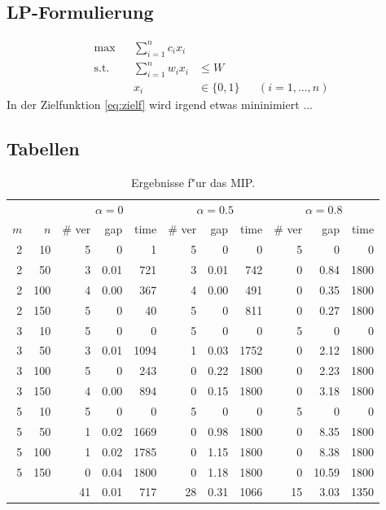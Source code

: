 \subsection{LP-Formulierung}
\label{subsec:lp}

\begin{align}
\max 	&& \sum_{i = 1}^n c_i x_i \label{eq:zielf}\\
\text{s.t.} && \sum_{i = 1}^n w_i x_i &\leq W&& \label{eq:c1}\\
	&& x_i & \in \{0, 1\} && (i = 1, \ldots, n)
\end{align}
In der Zielfunktion \eqref{eq:zielf} wird irgend etwas mininimiert ...



\subsection{Tabellen}

\begin{table}[!htbp] \centering
\small
\begin{tabular}{|r|r||r|r|r||r|r|r||r|r|r||} \hline
& & \multicolumn{3}{c||}{$\alpha=0$} & \multicolumn{3}{c||}{$\alpha=0.5$} & \multicolumn{3}{c||}{$\alpha=0.8$}\\
$m$ & $n$ & \# ver & gap & time &  \# ver & gap & time &  \# ver & gap & time  \\  \hline
2 & 10   & 5  & 0	& 1	& 5 & 0   	& 0	& 5 &0		& 0\\
2 & 50   & 3  & 0.01	& 721	& 3 & 0.01	& 742	& 0 &0.84	& 1800\\
2 & 100  & 4  & 0.00	& 367	& 4 & 0.00	& 491	& 0 &0.35	& 1800\\
2 & 150  & 5  & 0	& 40	& 5 & 0		& 811	& 0 &0.27	& 1800\\
3 & 10   & 5  & 0	& 0	& 5 & 0		& 0	& 5 &0 		& 0\\
3 & 50   & 3  & 0.01	& 1094	& 1 & 0.03	& 1752	& 0 &2.12	& 1800\\ 
3 & 100  & 5  & 0	& 243	& 0 & 0.22	& 1800	& 0 &2.23	& 1800\\
3 & 150  & 4  & 0.00	& 894	& 0 & 0.15	& 1800	& 0 &3.18	& 1800 \\
5 & 10   & 5  & 0	& 0	& 5 & 0 	& 0	& 5 &0 		& 0 \\
5 & 50   & 1  & 0.02	& 1669	& 0 & 0.98	& 1800	& 0 &8.35 	& 1800\\
5 & 100  & 1  & 0.02	& 1785	& 0 & 1.15	& 1800	& 0 &8.38 	& 1800 \\
5 & 150  & 0  & 0.04	& 1800	& 0 & 1.18	& 1800	& 0 &10.59 	& 1800 \\ \hline
\multicolumn{2}{l||}{\ }  &   
           41  &0.01	& 717	&28 & 0.31	& 1066	& 15 &3.03 	& 1350 
\end{tabular}
\caption{Ergebnisse f"ur das MIP.}
    \label{tab:mip_lb}
\end{table}


